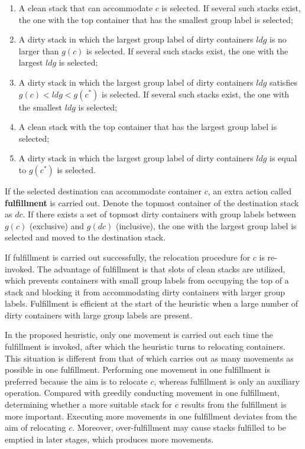\documentclass[review,3p,times,authoryear,12pt]{elsarticle}
\begin{document}
\begin{enumerate}[1.]
\item A clean stack that can accommodate $c$ is selected. If several such stacks exist, the one with the top container that has the smallest group label is selected;

\item A dirty stack in which the largest group label of dirty containers $\mathit{ldg}$ is no larger than $g(c)$ is selected. If several such stacks exist, the one with the largest $\mathit{ldg}$ is selected;

\item A dirty stack in which the largest group label of dirty containers $\mathit{ldg}$ satisfies $g(c)<\mathit{ldg}<g(c^*)$ is selected. If several such stacks exist, the one with the smallest $\mathit{ldg}$ is selected;

\item A clean stack with the top container that has the largest group label is selected;

\item A dirty stack in which the largest group label of dirty containers $\mathit{ldg}$ is equal to $g(c^*)$ is selected.
\end{enumerate}


If the selected destination can accommodate container $c$, an extra action called \textbf{fulfillment} is carried out. 
Denote the topmost container of the destination stack as $\mathit{dc}$. 
If there exists a set of topmost dirty containers with group labels between $g(c)$ (exclusive) and $g(\mathit{dc})$ (inclusive), the one with the largest group label is selected and moved to the destination stack.

If fulfillment is carried out successfully, the relocation procedure for $c$ is re-invoked. 
The advantage of fulfillment is that slots of clean stacks are utilized, which prevents containers with small group labels from occupying the top of a stack and blocking it from accommodating dirty containers with larger group labels. 
Fulfillment is efficient at the start of the heuristic when a large number of dirty containers with large group labels are present.

In the proposed heuristic, only one movement is carried out each time the fulfillment is invoked, after which the heuristic turns to relocating containers. 
This situation is different from that of \cite{Exposito2012} which carries out as many movements as possible in one fulfillment. 
Performing one movement in one fulfillment is preferred because the aim is to relocate $c$, whereas fulfillment is only an auxiliary operation. 
Compared with greedily conducting movement in one fulfillment, determining whether a more suitable stack for $c$ results from the fulfillment is more important. 
Executing more movements in one fulfillment deviates from the aim of relocating $c$. 
Moreover, over-fulfillment may cause stacks fulfilled to be emptied in later stages, which produces more movements.
\end{document}
